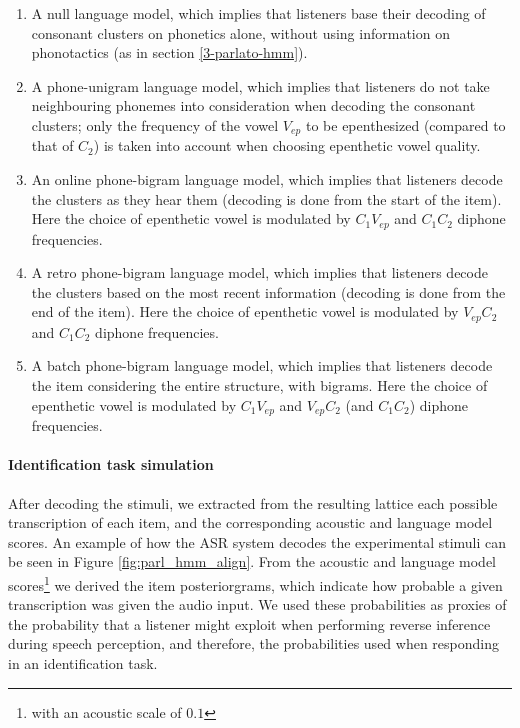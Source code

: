 \begin{enumerate}
    \item A null language model, which implies that listeners base their decoding of consonant clusters on phonetics alone, without using information on phonotactics (as in section \ref{3-parlato-hmm}).
    \item A phone-unigram language model, which implies that listeners do not take neighbouring phonemes into consideration when decoding the consonant clusters; only the frequency of the vowel $V_{ep}$ to be epenthesized (compared to that of $C_{2}$) is taken into account when choosing epenthetic vowel quality.
    \item An online phone-bigram language model, which implies that listeners decode the clusters as they hear them (decoding is done from the start of the item). Here the choice of epenthetic vowel is modulated by $C_{1}V_{ep}$ and $C_{1}C_{2}$ diphone frequencies. 
    \item A retro phone-bigram language model, which implies that listeners decode the clusters based on the most recent information (decoding is done from the end of the item). Here the choice of epenthetic vowel is modulated by $V_{ep}C_{2}$ and $C_{1}C_{2}$ diphone frequencies.
    \item A batch phone-bigram language model, which implies that listeners decode the item considering the entire structure, with bigrams. Here the choice of epenthetic vowel is modulated by $C_{1}V_{ep}$ and $V_{ep}C_{2}$ (and $C_{1}C_{2}$) diphone frequencies.  
\end{enumerate}

\paragraph{Identification task simulation}
After decoding the stimuli, we extracted from the resulting lattice each possible transcription of each item, and the corresponding acoustic and language model scores. An example of how the ASR system decodes the experimental stimuli can be seen in Figure \ref{fig:parl_hmm_align}. From the acoustic and language model scores\footnote{with an acoustic scale of $0.1$} we derived the item posteriorgrams, which indicate how probable a given transcription was given the audio input. We used these probabilities as proxies of the probability that a listener might exploit when performing reverse inference during speech perception, and therefore, the probabilities used when responding in an identification task. 

